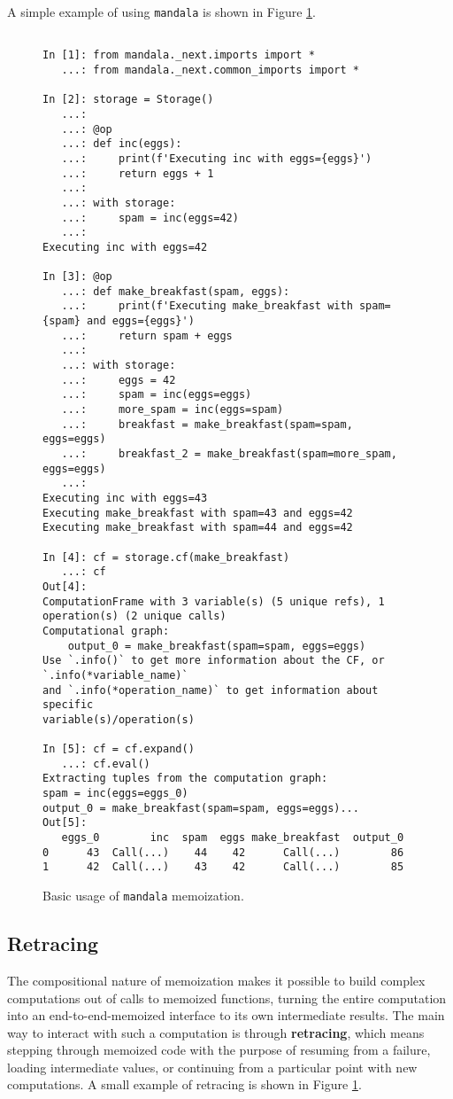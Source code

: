 \documentclass[11pt,twoside=semi,openright,numbers=noenddot]{scrartcl}
\begin{document}
A simple example of using \texttt{mandala} is shown in Figure \ref{fig:basic-usage}.

\begin{figure}
\begin{lstlisting}

In [1]: from mandala._next.imports import *
   ...: from mandala._next.common_imports import *

In [2]: storage = Storage()
   ...: 
   ...: @op
   ...: def inc(eggs):
   ...:     print(f'Executing inc with eggs={eggs}')
   ...:     return eggs + 1
   ...: 
   ...: with storage:
   ...:     spam = inc(eggs=42)
   ...: 
Executing inc with eggs=42

In [3]: @op
   ...: def make_breakfast(spam, eggs):
   ...:     print(f'Executing make_breakfast with spam={spam} and eggs={eggs}')
   ...:     return spam + eggs
   ...: 
   ...: with storage:
   ...:     eggs = 42
   ...:     spam = inc(eggs=eggs)
   ...:     more_spam = inc(eggs=spam)
   ...:     breakfast = make_breakfast(spam=spam, eggs=eggs)
   ...:     breakfast_2 = make_breakfast(spam=more_spam, eggs=eggs)
   ...: 
Executing inc with eggs=43
Executing make_breakfast with spam=43 and eggs=42
Executing make_breakfast with spam=44 and eggs=42

In [4]: cf = storage.cf(make_breakfast)
   ...: cf
Out[4]: 
ComputationFrame with 3 variable(s) (5 unique refs), 1 operation(s) (2 unique calls)
Computational graph:
    output_0 = make_breakfast(spam=spam, eggs=eggs)
Use `.info()` to get more information about the CF, or `.info(*variable_name)`
and `.info(*operation_name)` to get information about specific
variable(s)/operation(s)

In [5]: cf = cf.expand()
   ...: cf.eval()
Extracting tuples from the computation graph:
spam = inc(eggs=eggs_0)
output_0 = make_breakfast(spam=spam, eggs=eggs)...
Out[5]: 
   eggs_0        inc  spam  eggs make_breakfast  output_0
0      43  Call(...)    44    42      Call(...)        86
1      42  Call(...)    43    42      Call(...)        85

\end{lstlisting}
\caption{Basic usage of \texttt{mandala} memoization.}
\label{fig:basic-usage}
\end{figure}

\subsection{Retracing}
\label{subsection:}

The compositional nature of memoization makes it possible to build complex
computations out of calls to memoized functions, turning the entire computation
into an end-to-end-memoized interface to its own intermediate results. The main way to interact with such a computation is through \textbf{retracing}, which means stepping through memoized code with the purpose of resuming from a failure, loading intermediate values, or continuing from a particular point with new computations. A small example of retracing is shown in Figure \ref{fig:basic-usage}.
\end{document}

